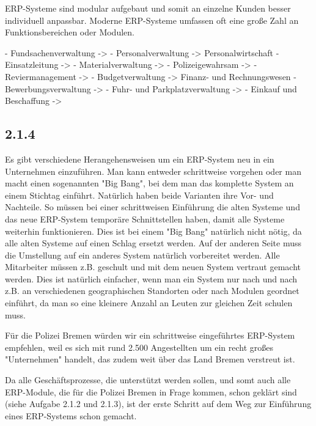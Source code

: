 \documentclass[12pt,utf8]{scrartcl}
\begin{document}
ERP-Systeme sind modular aufgebaut und somit an einzelne Kunden besser individuell anpassbar. Moderne ERP-Systeme umfassen oft eine große Zahl an Funktionsbereichen oder Modulen. 

- Fundsachenverwaltung -> 
- Personalverwaltung -> Personalwirtschaft
- Einsatzleitung -> 
- Materialverwaltung -> 
- Polizeigewahrsam -> 
- Reviermanagement -> 
- Budgetverwaltung -> Finanz- und Rechnungswesen
- Bewerbungsverwaltung -> 
- Fuhr- und Parkplatzverwaltung -> 
- Einkauf und Beschaffung -> 

\subsection*{2.1.4}

Es gibt verschiedene Herangehensweisen um ein ERP-System neu in ein Unternehmen einzuführen. Man kann entweder schrittweise vorgehen oder man macht einen sogenannten "Big Bang", bei dem man das komplette System an einem Stichtag einführt. Natürlich haben beide Varianten ihre Vor- und Nachteile. So müssen bei einer schrittweisen Einführung die alten Systeme und das neue ERP-System temporäre Schnittstellen haben, damit alle Systeme weiterhin funktionieren. Dies ist bei einem "Big Bang" natürlich nicht nötig, da alle alten Systeme auf einen Schlag ersetzt werden. Auf der anderen Seite muss die Umstellung auf ein anderes System natürlich vorbereitet werden. Alle Mitarbeiter müssen z.B. geschult und mit dem neuen System vertraut gemacht werden. Dies ist natürlich einfacher, wenn man ein System nur nach und nach z.B. an verschiedenen geographischen Standorten oder nach Modulen geordnet einführt, da man so eine kleinere Anzahl an Leuten zur gleichen Zeit schulen muss\cite{Jacob2008}. 

Für die Polizei Bremen würden wir ein schrittweise eingeführtes ERP-System empfehlen, weil es sich mit rund 2.500 Angestellten um ein recht großes "Unternehmen" handelt, das zudem weit über das Land Bremen verstreut ist\cite{PolizeiBremen}. 

Da alle Geschäftsprozesse, die unterstützt werden sollen, und somt auch alle ERP-Module, die für die Polizei Bremen in Frage kommen, schon geklärt sind (siehe Aufgabe 2.1.2 und 2.1.3), ist der erste Schritt auf dem Weg zur Einführung eines ERP-Systems schon gemacht. 

\newpage
\begin{flushleft}

\end{flushleft}
\end{document}
